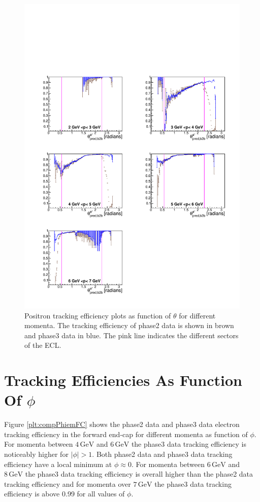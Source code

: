 \documentclass[a4paper,11pt,twosided,final,german,openbib,pdftex,listof=totoc,bibliography=totoc]{scrbook}
\begin{document}
\begin{figure}[!htbp]
	\centering
	\includegraphics[width=\textwidth]{Plots/comp/cMThetaep_Data.pdf}
	\caption[Momentum $\theta$ Positron Efficiency]{Positron tracking efficiency plots as function of $\theta$ for different momenta. The tracking efficiency of phase2 data is shown in brown and phase3 data in blue. The pink line indicates the different sectors of the ECL.}
	\label{plt:compThetaep}
\end{figure}

\newpage 

\section{Tracking Efficiencies As Function Of $\phi$}

Figure \ref{plt:compPhiemFC} shows the phase2 data and phase3 data electron tracking efficiency in the forward end-cap for different momenta as function of $\phi$. 
For momenta between $4\,\textrm{GeV}$ and $6\,\textrm{GeV}$ the phase3 data tracking efficiency is noticeably higher for $|\phi| > 1$. Both phase2 data and phase3 data tracking efficiency have a local minimum at $\phi \approx 0$. 
For momenta between $6\,\textrm{GeV}$ and $8\,\textrm{GeV}$ the phase3 data tracking efficiency is overall higher than the phase2 data tracking efficiency and for momenta over $7\,\textrm{GeV}$ the phase3 data tracking efficiency is above 0.99 for all values of $\phi$.
\end{document}
